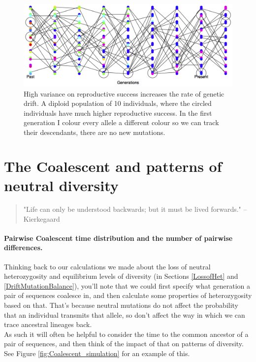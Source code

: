 \begin{figure}
\begin{center}
\includegraphics[width= \textwidth]{figures/Loss_of_he_col_alleles_varying_RS.png}
\end{center}
\caption{High variance on reproductive success increases the rate of genetic drift. A diploid population of 10 individuals, where the circled
  individuals have much higher reproductive success. In the first generation I colour every allele a different
colour so we can track their descendants, there are no new
  mutations.} \label{fig:LossHet_varying_RS}
\end{figure} 


\section{The Coalescent and patterns of neutral diversity}

\begin{quote}
"Life can only be understood backwards; but it must be lived
forwards." -- Kierkegaard
\end{quote}

\paragraph{Pairwise Coalescent time distribution and the number of
 pairwise differences.}
Thinking back to our calculations we made about the loss of neutral heterozygosity
and equilibrium levels of diversity (in Sections \ref{LossofHet} and \ref{DriftMutationBalance}), you'll note that we could first specify
what generation a pair of sequences coalesce in, and then calculate
some properties of heterozygosity based on that. That's because neutral
mutations do not affect the probability that an individual transmits
that allele, so don't affect the way in which we can trace ancestral lineages
back. \\


As such it will often be helpful to consider the time to the common
ancestor of a pair of sequences, and then think of the impact of that
on patterns of diversity. See Figure \ref{fig:Coalescent_simulation}
for an example of this. 

